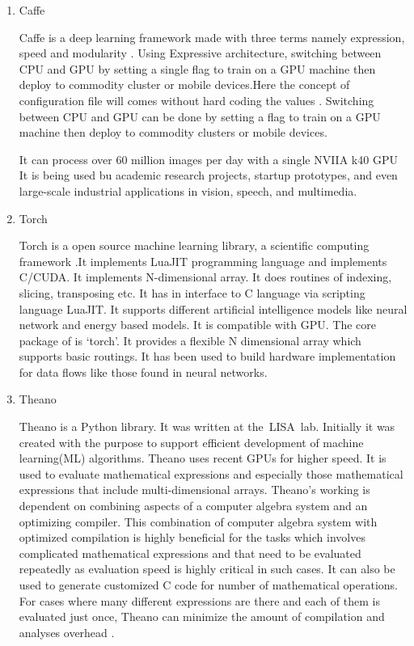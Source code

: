 \begin{enumerate}
\item {} 
Caffe

Caffe is a deep learning framework made with three terms namely
expression, speed and modularity \label{\detokenize{i524/technologies:id99}}{\hyperref[\detokenize{i524/technologies:www-caffe}]{\sphinxcrossref{{[}89{]}}}}. Using
Expressive architecture, switching between CPU and GPU by setting
a single flag to train on a GPU machine then deploy to commodity
cluster or mobile devices.Here the concept of configuration file
will comes without hard coding the values . Switching between CPU
and GPU can be done by setting a flag to train on a GPU machine
then deploy to commodity clusters or mobile devices.

It can process over 60 million images per day with a single NVIIA
k40 GPU It is being used bu academic research projects, startup
prototypes, and even large-scale industrial applications in
vision, speech, and multimedia.

\item {} 
Torch

Torch is a open source machine learning library, a scientific
computing framework \label{\detokenize{i524/technologies:id100}}{\hyperref[\detokenize{i524/technologies:www-torch}]{\sphinxcrossref{{[}90{]}}}} .It implements LuaJIT
programming language and implements C/CUDA. It implements
N-dimensional array. It does routines of indexing, slicing,
transposing etc. It has in interface to C language via scripting
language LuaJIT. It supports different artificial intelligence
models like neural network and energy based models. It is
compatible with GPU.  The core package of is ‘torch’. It provides
a flexible N dimensional array which supports basic routings. It
has been used to build hardware implementation for data flows like
those found in neural networks.

\item {} 
Theano

Theano is a Python library. It was written at the LISA lab.
Initially it was created with the purpose to support efficient
development of machine learning(ML) algorithms.  Theano uses
recent GPUs for higher speed.  It is used to evaluate mathematical
expressions and especially those mathematical expressions that
include multi-dimensional arrays.  Theano’s working is dependent
on combining aspects of a computer algebra system and an
optimizing compiler.  This combination of computer algebra system
with optimized compilation is highly beneficial for the tasks
which involves complicated mathematical expressions and that need
to be evaluated repeatedly as evaluation speed is highly critical
in such cases.  It can also be used to generate customized C code
for number of mathematical operations.  For cases where many
different expressions are there and each of them is evaluated just
once, Theano can minimize the amount of compilation and analyses
overhead \label{\detokenize{i524/technologies:id101}}{\hyperref[\detokenize{i524/technologies:www-theano}]{\sphinxcrossref{{[}91{]}}}}.


\end{enumerate}
